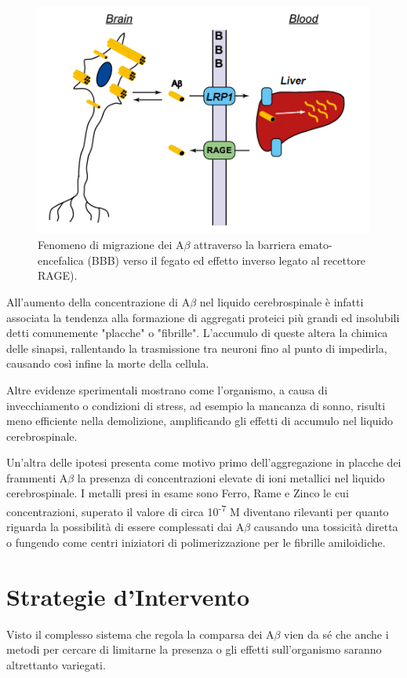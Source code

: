\documentclass[a4paper, 12pt]{article}
\begin{document}
\begin{figure}[H]
	\centering
	\includegraphics[width=.8\linewidth]{immagini/bbb.png}
	\caption{Fenomeno di migrazione dei A\(\beta\) attraverso la barriera emato-encefalica (BBB) verso il fegato ed effetto inverso legato al recettore RAGE).}
	\label{fig:bbb}
\end{figure}

All'aumento della concentrazione di A\(\beta\) nel liquido cerebrospinale è infatti associata la tendenza alla formazione di aggregati proteici più grandi ed insolubili detti comunemente "placche" o "fibrille".
L'accumulo di queste altera la chimica delle sinapsi, rallentando la trasmissione tra neuroni fino al punto di impedirla, causando così infine la morte della cellula.

Altre evidenze sperimentali mostrano come l’organismo, a causa di invecchiamento o condizioni di stress, ad esempio la mancanza di sonno, risulti meno efficiente nella demolizione, amplificando gli effetti di accumulo nel liquido cerebrospinale.

Un'altra delle ipotesi presenta come motivo primo dell'aggregazione in placche dei frammenti A\(\beta\) la presenza di concentrazioni elevate di ioni metallici nel liquido cerebrospinale. I metalli presi in esame sono Ferro, Rame e Zinco le cui concentrazioni, superato il valore di circa 10\textsuperscript{-7}  M diventano rilevanti per quanto riguarda la possibilità di essere complessati dai A\(\beta\) causando una tossicità diretta o fungendo come centri iniziatori di polimerizzazione per le fibrille amiloidiche.\autocite{kepp_bioinorganic_2012}

\section{Strategie d'Intervento}
Visto il complesso sistema che regola la comparsa dei A\(\beta\) vien da sé che anche i metodi per cercare di limitarne la presenza o gli effetti sull'organismo saranno altrettanto variegati.
\end{document}
